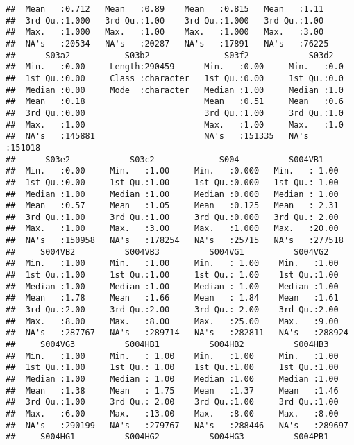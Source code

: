 \documentclass[
]{article}
\begin{document}
\begin{verbatim}
##  Mean   :0.712   Mean   :0.89    Mean   :0.815   Mean   :1.11   
##  3rd Qu.:1.000   3rd Qu.:1.00    3rd Qu.:1.000   3rd Qu.:1.00   
##  Max.   :1.000   Max.   :1.00    Max.   :1.000   Max.   :3.00   
##  NA's   :20534   NA's   :20287   NA's   :17891   NA's   :76225  
##      S03a2           S03b2               S03f2            S03d2       
##  Min.   :0.00     Length:290459      Min.   :0.00     Min.   :0.0     
##  1st Qu.:0.00     Class :character   1st Qu.:0.00     1st Qu.:0.0     
##  Median :0.00     Mode  :character   Median :1.00     Median :1.0     
##  Mean   :0.18                        Mean   :0.51     Mean   :0.6     
##  3rd Qu.:0.00                        3rd Qu.:1.00     3rd Qu.:1.0     
##  Max.   :1.00                        Max.   :1.00     Max.   :1.0     
##  NA's   :145881                      NA's   :151335   NA's   :151018  
##      S03e2            S03c2             S004          S004VB1      
##  Min.   :0.00     Min.   :1.00     Min.   :0.000   Min.   : 1.00   
##  1st Qu.:0.00     1st Qu.:1.00     1st Qu.:0.000   1st Qu.: 1.00   
##  Median :1.00     Median :1.00     Median :0.000   Median : 1.00   
##  Mean   :0.57     Mean   :1.05     Mean   :0.125   Mean   : 2.31   
##  3rd Qu.:1.00     3rd Qu.:1.00     3rd Qu.:0.000   3rd Qu.: 2.00   
##  Max.   :1.00     Max.   :3.00     Max.   :1.000   Max.   :20.00   
##  NA's   :150958   NA's   :178254   NA's   :25715   NA's   :277518  
##     S004VB2          S004VB3          S004VG1          S004VG2      
##  Min.   :1.00     Min.   :1.00     Min.   : 1.00    Min.   :1.00    
##  1st Qu.:1.00     1st Qu.:1.00     1st Qu.: 1.00    1st Qu.:1.00    
##  Median :1.00     Median :1.00     Median : 1.00    Median :1.00    
##  Mean   :1.78     Mean   :1.66     Mean   : 1.84    Mean   :1.61    
##  3rd Qu.:2.00     3rd Qu.:2.00     3rd Qu.: 2.00    3rd Qu.:2.00    
##  Max.   :8.00     Max.   :8.00     Max.   :25.00    Max.   :9.00    
##  NA's   :287767   NA's   :289714   NA's   :282811   NA's   :288924  
##     S004VG3          S004HB1          S004HB2          S004HB3      
##  Min.   :1.00     Min.   : 1.00    Min.   :1.00     Min.   :1.00    
##  1st Qu.:1.00     1st Qu.: 1.00    1st Qu.:1.00     1st Qu.:1.00    
##  Median :1.00     Median : 1.00    Median :1.00     Median :1.00    
##  Mean   :1.38     Mean   : 1.75    Mean   :1.37     Mean   :1.46    
##  3rd Qu.:1.00     3rd Qu.: 2.00    3rd Qu.:1.00     3rd Qu.:1.00    
##  Max.   :6.00     Max.   :13.00    Max.   :8.00     Max.   :8.00    
##  NA's   :290199   NA's   :279767   NA's   :288446   NA's   :289697  
##     S004HG1          S004HG2          S004HG3          S004PB1      

\end{verbatim}
\end{document}

